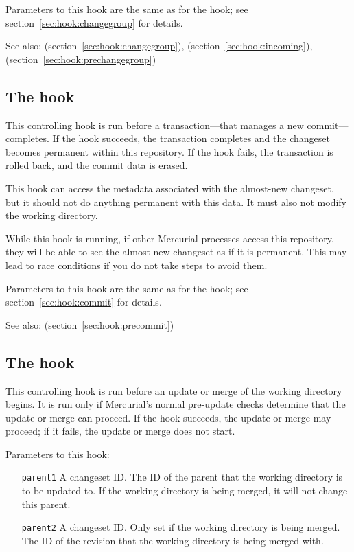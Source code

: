 Parameters to this hook are the same as for the 
hook; see section~\ref{sec:hook:changegroup} for details.

See also:  (section~\ref{sec:hook:changegroup}),
 (section~\ref{sec:hook:incoming}),
 (section~\ref{sec:hook:prechangegroup})

\subsection{The  hook}
\label{sec:hook:pretxncommit}

This controlling hook is run before a transaction---that manages a new
commit---completes.  If the hook succeeds, the transaction completes
and the changeset becomes permanent within this repository.  If the
hook fails, the transaction is rolled back, and the commit data is
erased.

This hook can access the metadata associated with the almost-new
changeset, but it should not do anything permanent with this data.  It
must also not modify the working directory.

While this hook is running, if other Mercurial processes access this
repository, they will be able to see the almost-new changeset as if it
is permanent.  This may lead to race conditions if you do not take
steps to avoid them.

Parameters to this hook are the same as for the  hook;
see section~\ref{sec:hook:commit} for details.

See also:  (section~\ref{sec:hook:precommit})

\subsection{The  hook}
\label{sec:hook:preupdate}

This controlling hook is run before an update or merge of the working
directory begins.  It is run only if Mercurial's normal pre-update
checks determine that the update or merge can proceed.  If the hook
succeeds, the update or merge may proceed; if it fails, the update or
merge does not start.

Parameters to this hook:
\begin{itemize}
\item[\texttt{parent1}] A changeset ID.  The ID of the parent that the
  working directory is to be updated to.  If the working directory is
  being merged, it will not change this parent.
\item[\texttt{parent2}] A changeset ID.  Only set if the working
  directory is being merged.  The ID of the revision that the working
  directory is being merged with.
\end{itemize}

